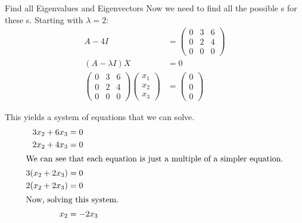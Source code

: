 \begin{example}{Find all Eigenvalues and Eigenvectors}
  Now we need to find all the possible s for these s.
  Starting with $\lambda = 2$:
  \begin{align*}
    A - 4I &=
             \begin{pmatrix}
               0 & 3 & 6 \\
               0 & 2 & 4 \\
               0 & 0 & 0
             \end{pmatrix} \\
    (A-\lambda I) X &= 0 \\
    \begin{pmatrix}
      0 & 3 & 6 \\
      0 & 2 & 4 \\
      0 & 0 & 0
    \end{pmatrix}
              \begin{pmatrix}
                x_{1} \\
                x_{2} \\
                x_{3}
              \end{pmatrix}
    &=
      \begin{pmatrix}
        0 \\
        0 \\
        0
      \end{pmatrix}
  \end{align*}

  This yields a system of equations that we can solve.
  \begin{align*}
    3x_{2} + 6x_{3} &= 0 \\
    2x_{2} + 4x_{3} &= 0 \\
    \intertext{We can see that each equation is just a multiple of a simpler equation.}
    3 (x_{2} + 2x_{3}) &= 0 \\
    2 (x_{2} + 2x_{3}) &= 0 \\
    \shortintertext{Now, solving this system.}
    x_{2} &= -2x_{3}
  \end{align*}


\end{example}
